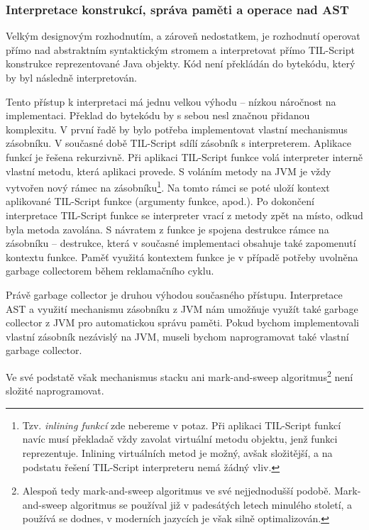 \subsubsection{
  Interpretace konstrukcí, správa paměti a operace nad AST}\label{interpretation-of-constructions}

Velkým designovým rozhodnutím, a zároveň nedostatkem, je rozhodnutí operovat přímo nad abstraktním
syntaktickým stromem a interpretovat přímo TIL-Script konstrukce reprezentované Java objekty. Kód
není překládán do bytekódu, který by byl následně interpretován.

Tento přístup k interpretaci má jednu velkou výhodu -- nízkou náročnost na implementaci. Překlad
do bytekódu by s sebou nesl značnou přidanou komplexitu. V první řadě by bylo potřeba implementovat
vlastní mechanismus zásobníku. V současné době TIL-Script sdílí zásobník s interpreterem. Aplikace
funkcí je řešena rekurzivně. Při aplikaci TIL-Script funkce volá interpreter interně vlastní metodu,
která aplikaci provede. S voláním metody na JVM je vždy vytvořen nový rámec na zásobníku\footnote{
  Tzv. \textit{inlining funkcí} zde nebereme v potaz. Při aplikaci TIL-Script funkcí navíc musí
  překladač vždy zavolat virtuální metodu objektu, jenž funkci reprezentuje. Inlining virtuálních
  metod je možný, avšak složitější, a na podstatu řešení TIL-Script interpreteru nemá žádný vliv.
}.
Na tomto rámci se poté uloží kontext aplikované TIL-Script funkce (argumenty funkce, apod.).
Po dokončení interpretace TIL-Script funkce se interpreter vrací z metody zpět na místo, odkud byla
metoda zavolána. S návratem z funkce je spojena destrukce rámce na zásobníku -- destrukce, která
v současné implementaci obsahuje také zapomenutí kontextu funkce. Paměť využitá kontextem funkce
je v případě potřeby uvolněna garbage collectorem během reklamačního cyklu.

Právě garbage collector je druhou výhodou současného přístupu. Interpretace AST a využití mechanismu
zásobníku z JVM nám umožňuje využít také garbage collector z JVM pro automatickou správu paměti.
Pokud bychom implementovali vlastní zásobník nezávislý na JVM, museli bychom naprogramovat také
vlastní garbage collector.

Ve své podstatě však mechanismus stacku ani mark-and-sweep algoritmus\footnote{Alespoň tedy
  mark-and-sweep algoritmus ve své nejjednodušší podobě. Mark-and-sweep algoritmus se používal již
  v padesátých letech minulého století, a používá se dodnes, v moderních jazycích je však silně
  optimalizován.} není složité naprogramovat.

